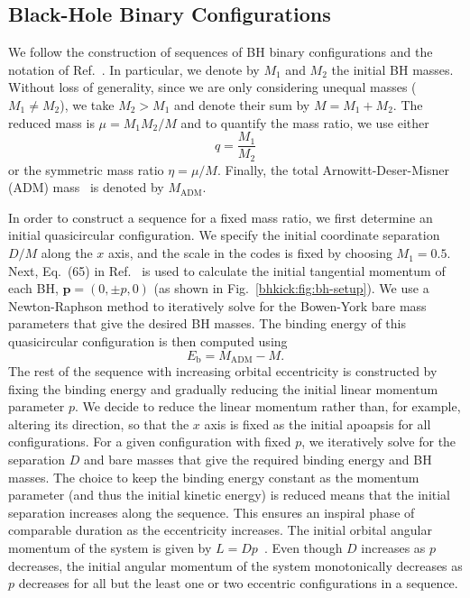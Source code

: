 \subsection{Black-Hole Binary Configurations}
%
\label{bhkick:sec:configs}
%
We follow the construction of sequences of BH binary configurations
and the notation of Ref.~\cite{Sperhake:2007gu}. In particular, we
denote by $M_1$
and $M_2$ the initial BH masses. Without loss of generality, since
we are only considering unequal masses ($M_1 \neq M_2$), we take $M_2 > M_1$
and denote their sum by $M = M_1 + M_2$. The reduced mass is
$\mu = M_1 M_2 /M$ and to quantify the mass ratio, we use either
\begin{equation}
    q = \frac{M_1}{M_2}
    \label{bhkick:eq:mass-ratio}
\end{equation}
or the symmetric mass ratio $\eta = \mu/M$. Finally, the
total Arnowitt-Deser-Misner (ADM) mass~\cite{Arnowitt:1962hi} is denoted by
$M_{\mathrm{ADM}}$.


In order to construct a sequence for a fixed mass ratio, we first
determine an initial quasicircular configuration. We specify the initial
coordinate separation $D/M$ along the $x$ axis, and the scale in the codes
is fixed by choosing $M_1=0.5$. Next, Eq.~(65) in
Ref.~\cite{Brugmann:2008zz} is used to calculate the initial tangential
momentum of each BH, $\mathbf{p}=(0,\pm p,0)$ (as shown in
Fig.~\ref{bhkick:fig:bh-setup}). We use a
Newton-Raphson method to iteratively solve for the Bowen-York bare mass
parameters that give the desired BH masses. The binding energy
of this quasicircular configuration is then computed using
\begin{equation}
    E_{\mathrm{b}}=M_{\mathrm{ADM}}-M.\label{bhkick:eq:binding-energy}
\end{equation}
The rest of the sequence with increasing orbital eccentricity is
constructed by fixing the binding energy and gradually reducing the initial
linear momentum parameter $p$.
We decide to reduce the linear momentum rather than, for example,
altering its direction,
so that the $x$ axis is fixed as the initial apoapsis for all configurations.
For a given configuration with fixed $p$, we
iteratively solve for the separation $D$ and bare masses that give the
required binding energy and BH masses. The choice to keep the
binding energy constant as the momentum parameter (and thus the initial
kinetic energy) is reduced means that the initial separation increases along
the sequence. This ensures an inspiral phase of comparable duration as the
eccentricity increases.
The initial orbital angular momentum of the system
is given by $L=Dp$~\cite{York:1989jn}. Even though $D$ increases as $p$
decreases, the initial angular momentum of the system monotonically decreases
as $p$ decreases for all but the least one or two eccentric configurations
in a sequence.



